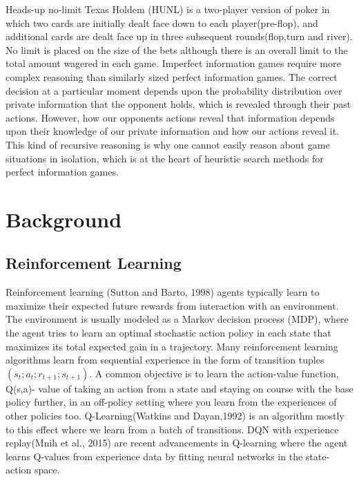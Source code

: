\documentclass{article}
\begin{document}
Heads-up no-limit Texas Holdem (HUNL) is a two-player version of poker in which two cards are initially dealt face down to each player(pre-flop), and additional cards are dealt face up in three subsequent rounds(flop,turn and river). No limit is placed on the size of the bets although there is an overall limit to the total amount wagered in each game. Imperfect information games require more complex reasoning than similarly sized perfect information games. The correct decision at a particular
moment depends upon the probability distribution over private information that the opponent holds, which is revealed through their past actions. However, how our opponents actions reveal that information depends upon their knowledge of our private information and how our actions reveal it. This kind of
recursive reasoning is why one cannot easily reason about game situations in isolation, which is at the heart of heuristic search methods for perfect information games.

\section{Background}
\subsection{Reinforcement Learning}
Reinforcement learning (Sutton and Barto, 1998) agents typically learn to maximize their expected
future rewards from interaction with an environment. The environment is usually modeled as a
Markov decision process (MDP), where the agent tries to learn an optimal stochastic action policy in each state that maximizes its total expected gain in a trajectory. Many reinforcement learning algorithms learn from sequential experience in the form of transition tuples $(s_t; a_t; r_{t+1}; s_{t+1})$. A common objective is to learn the action-value function, Q(s,a)- value of taking an action from a state and staying on course with the base policy further, in an off-policy setting where you learn from the experiences of other policies too. Q-Learning(Watkins and Dayan,1992) is an algorithm mostly to this effect where we learn from a batch of transitions. DQN with experience replay(Mnih et al., 2015) are recent advancements in Q-learning where the agent learns Q-values from experience data by fitting neural networks in the state-action space.
\end{document}
